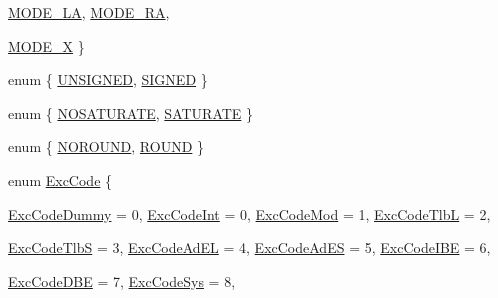 \begin{DoxyCompactItemize}
\hyperlink{namespaceMipsISA_a16af7b253440dadd46a80a4b9fddba4da4d5086e26428bf5e596c0b3e4f958864}{MODE\_\-LA}, 
\hyperlink{namespaceMipsISA_a16af7b253440dadd46a80a4b9fddba4da0f1a8b9779ed0c560a34f70718886e6b}{MODE\_\-RA}, 
\par
\hyperlink{namespaceMipsISA_a16af7b253440dadd46a80a4b9fddba4da4075c4606eccc17129439d2731946928}{MODE\_\-X}
 \}
\item 
enum \{ \hyperlink{namespaceMipsISA_aba01db17f4a2bfbc3db60dc172972a25a963d7504ea1673678a3975db022f78dc}{UNSIGNED}, 
\hyperlink{namespaceMipsISA_aba01db17f4a2bfbc3db60dc172972a25af01dd5eba2a30a3e11b3966a7265cc37}{SIGNED}
 \}
\item 
enum \{ \hyperlink{namespaceMipsISA_aaf105ae5beaca1dee30ae54530691fcea495cd46084663e42ad17474f442ee61f}{NOSATURATE}, 
\hyperlink{namespaceMipsISA_aaf105ae5beaca1dee30ae54530691fcea421117ed0d29ef63fb53e7e69ef87f9b}{SATURATE}
 \}
\item 
enum \{ \hyperlink{namespaceMipsISA_a80155586fa275b28773c9b203f52cabaac94faa8a50cfa1b579041fcdc157ab45}{NOROUND}, 
\hyperlink{namespaceMipsISA_a80155586fa275b28773c9b203f52cabaa53c572a1b8255c935b3501df579fc1d9}{ROUND}
 \}
\item 
enum \hyperlink{namespaceMipsISA_abcc8a7c57cd8becefbfd621dbff5ffd4}{ExcCode} \{ \par
\hyperlink{namespaceMipsISA_abcc8a7c57cd8becefbfd621dbff5ffd4ae755cb1bc5837466d3b27bd12b5c06b3}{ExcCodeDummy} =  0, 
\hyperlink{namespaceMipsISA_abcc8a7c57cd8becefbfd621dbff5ffd4a3c943598c12d27984a15e1af7b4aa238}{ExcCodeInt} =  0, 
\hyperlink{namespaceMipsISA_abcc8a7c57cd8becefbfd621dbff5ffd4a22ded6b1dd00d5387929ac2d357e0c62}{ExcCodeMod} =  1, 
\hyperlink{namespaceMipsISA_abcc8a7c57cd8becefbfd621dbff5ffd4aead7e6d68e9e4bb0b9da34c0639c7574}{ExcCodeTlbL} =  2, 
\par
\hyperlink{namespaceMipsISA_abcc8a7c57cd8becefbfd621dbff5ffd4a5b4d5d68f22c53c153e4043d7814eeb4}{ExcCodeTlbS} =  3, 
\hyperlink{namespaceMipsISA_abcc8a7c57cd8becefbfd621dbff5ffd4a88c8626de76621519043428a669f8428}{ExcCodeAdEL} =  4, 
\hyperlink{namespaceMipsISA_abcc8a7c57cd8becefbfd621dbff5ffd4abedfbe894e97dcc3af2409032d2f41a0}{ExcCodeAdES} =  5, 
\hyperlink{namespaceMipsISA_abcc8a7c57cd8becefbfd621dbff5ffd4aa6c6e25047e2925aa1dac5fb15016ba1}{ExcCodeIBE} =  6, 
\par
\hyperlink{namespaceMipsISA_abcc8a7c57cd8becefbfd621dbff5ffd4a85f2ac2cb1fdd0c42a93e51ed4246189}{ExcCodeDBE} =  7, 
\hyperlink{namespaceMipsISA_abcc8a7c57cd8becefbfd621dbff5ffd4af3d90d688c82f9748f512de065d11867}{ExcCodeSys} =  8, 

\end{DoxyCompactItemize}
